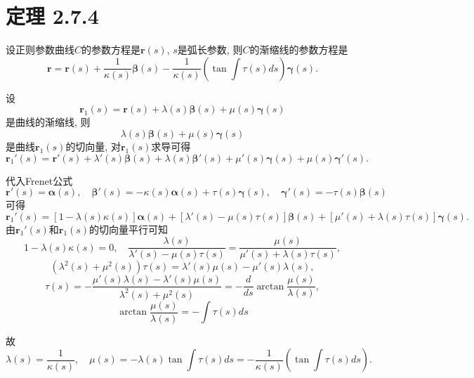 \documentclass[11pt,a4paper]{article}
\author{刘逸灏 (515370910207)}
\begin{document}
\maketitle

\section*{定理 2.7.4}
\begin{problem}
  设正则参数曲线$C$的参数方程是$\mathbf{r}(s)$, $s$是弧长参数, 则$C$的渐缩线的参数方程是
  $$\mathbf{r}=\mathbf{r}(s)+\frac{1}{\kappa(s)}\boldsymbol\beta(s)-\frac{1}{\kappa(s)}\left(\tan\int\tau(s)ds\right)\boldsymbol\gamma(s).$$
\end{problem}

设$$\mathbf{r}_1(s)=\mathbf{r}(s)+\lambda(s)\boldsymbol\beta(s)+\mu(s)\boldsymbol\gamma(s)$$是曲线的渐缩线, 则$$\lambda(s)\boldsymbol\beta(s)+\mu(s)\boldsymbol\gamma(s)$$是曲线$\mathbf{r}_1(s)$的切向量, 对$\mathbf{r}_1(s)$求导可得
$$\mathbf{r}_1'(s)=\mathbf{r}'(s)+\lambda'(s)\boldsymbol\beta(s)+\lambda(s)\boldsymbol\beta'(s)+\mu'(s)\boldsymbol\gamma(s)+\mu(s)\boldsymbol\gamma'(s).$$

代入Frenet公式
$$\mathbf{r}'(s)=\boldsymbol\alpha(s),\quad \boldsymbol\beta'(s)=-\kappa(s)\boldsymbol\alpha(s)+\tau(s)\boldsymbol\gamma(s),\quad \boldsymbol\gamma'(s)=-\tau(s)\boldsymbol\beta(s)$$
可得
$$\mathbf{r}_1'(s)=[1-\lambda(s)\kappa(s)]\boldsymbol\alpha(s)+[\lambda'(s)-\mu(s)\tau(s)]\boldsymbol\beta(s)+[\mu'(s)+\lambda(s)\tau(s)]\boldsymbol\gamma(s).$$
由$\mathbf{r}_1'(s)$和$\mathbf{r}_1(s)$的切向量平行可知
$$1-\lambda(s)\kappa(s)=0,\quad \frac{\lambda(s)}{\lambda'(s)-\mu(s)\tau(s)}=\frac{\mu(s)}{\mu'(s)+\lambda(s)\tau(s)},$$
$$(\lambda^2(s)+\mu^2(s))\tau(s)=\lambda'(s)\mu(s)-\mu'(s)\lambda(s),$$
$$\tau(s)=-\frac{\mu'(s)\lambda(s)-\lambda'(s)\mu(s)}{\lambda^2(s)+\mu^2(s)}=-\frac{d}{ds}\arctan\frac{\mu(s)}{\lambda(s)},$$
$$\arctan\frac{\mu(s)}{\lambda(s)}=-\int\tau(s)ds$$

故
$$\lambda(s)=\frac{1}{\kappa(s)},\quad \mu(s)=-\lambda(s)\tan\int\tau(s)ds=-\frac{1}{\kappa(s)}\left(\tan\int\tau(s)ds\right).$$
\end{document}
